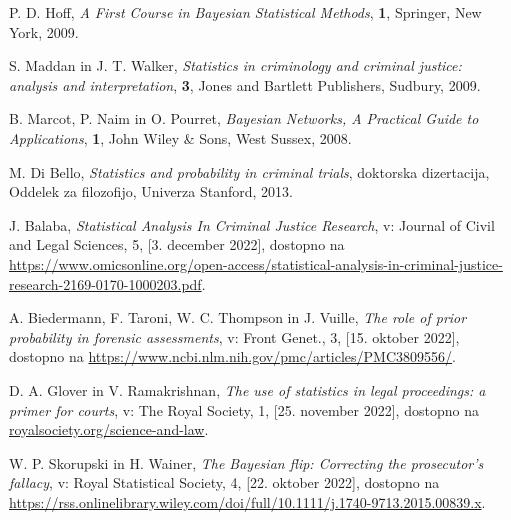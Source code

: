 \documentclass{beamer}
\begin{document}
\begin{frame}
    \begin{thebibliography}{99}
        P. D. Hoff, \emph{A First Course in Bayesian Statistical Methods}, \textbf{1}, Springer, New York, 2009.

        S. Maddan in J. T. Walker, \emph{Statistics in criminology and criminal justice: analysis and interpretation}, \textbf{3}, Jones and Bartlett Publishers, Sudbury, 2009.

        B. Marcot, P. Naim in O. Pourret, \emph{Bayesian Networks, A Practical Guide to Applications}, \textbf{1}, John Wiley \& Sons, West Sussex, 2008.

        M. Di Bello, \emph{Statistics and probability in criminal trials}, doktorska dizertacija, Oddelek za filozofijo, Univerza Stanford, 2013.

        J. Balaba, \emph{Statistical Analysis In Criminal Justice Research}, v: Journal of Civil and Legal Sciences, 5, [3. december 2022], dostopno na \url{https://www.omicsonline.org/open-access/statistical-analysis-in-criminal-justice-research-2169-0170-1000203.pdf}.

    \end{thebibliography}
\end{frame}

\begin{frame}
    \begin{thebibliography}{99}
        A. Biedermann, F. Taroni, W. C. Thompson in J. Vuille, \emph{The role of prior probability in forensic assessments}, v: Front Genet., 3, [15. oktober 2022], dostopno na \url{https://www.ncbi.nlm.nih.gov/pmc/articles/PMC3809556/}.

    D. A. Glover in V. Ramakrishnan, \emph{The use of statistics in legal proceedings: a primer for courts}, v: The Royal Society, 1, [25. november 2022], dostopno na \url{royalsociety.org/science-and-law}.

    W. P. Skorupski in H. Wainer, \emph{The Bayesian flip: Correcting the prosecutor's fallacy}, v: Royal Statistical Society, 4, [22. oktober 2022], dostopno na \url{https://rss.onlinelibrary.wiley.com/doi/full/10.1111/j.1740-9713.2015.00839.x}.
    \end{thebibliography}
\end{frame}
\end{document}
